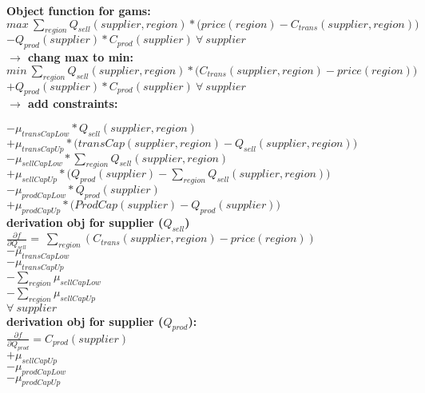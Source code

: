 \documentclass{article}
\begin{document}
\textbf{Object function for gams:}\\
\quad$ max\:\sum_{region} Q_{sell}(supplier, region) *\Big(price(region) - C_{trans}(supplier,region)\Big) $\\
\quad$- Q_{prod}(supplier)*C_{prod}(supplier)\:\forall\: supplier $\\

\textbf{$\rightarrow$ chang max to min:}\\

\quad$ min\:\sum_{region} Q_{sell}(supplier, region) *\Big(C_{trans}(supplier,region) - price(region)\Big) $\\
\quad$+ Q_{prod}(supplier)*C_{prod}(supplier)\:\forall\: supplier$ \\

\textbf{$\rightarrow$ add constraints:}

\quad$ - \mu_{transCapLow} * Q_{sell}(supplier, region)$\\
\quad$ + \mu_{transCapUp} * \Big(transCap(supplier, region) - Q_{sell}(supplier, region)\Big)$\\
\quad$ - \mu_{sellCapLow} * \sum_{region} Q_{sell}(supplier, region)$\\
\quad$ + \mu_{sellCapUp}*\Big( Q_{prod}(supplier) -\sum_{region} Q_{sell}(supplier, region)\Big)$\\
\quad$ - \mu_{prodCapLow} * Q_{prod}(supplier)$\\
\quad$ + \mu_{prodCapUp}*\Big( ProdCap(supplier) - Q_{prod}(supplier)\Big)	$\\


\textbf{derivation obj for supplier ($Q_{sell}$)}\\
\quad$\frac{\partial f}{\partial Q_{sell}} = \:\sum_{region} (C_{trans}(supplier,region) - price(region))$\\
\quad$ - \mu_{transCapLow}$\\
\quad$ - \mu_{transCapUp}$\\
\quad$ - \sum_{region} \mu_{sellCapLow}$\\
\quad$ - \sum_{region} \mu_{sellCapUp}$\\

\quad$\forall \:supplier$\\

\textbf{derivation obj for supplier ($Q_{prod}$):}\\
\quad$\frac{\partial f}{\partial Q_{prod}} = C_{prod}(supplier)\:$\\
\quad$ + \mu_{sellCapUp}$\\
\quad$ - \mu_{prodCapLow}$\\
\quad$ - \mu_{prodCapUp}$\\
\end{document}
